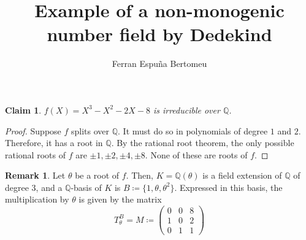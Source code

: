 \documentclass[11pt]{article}
\title{Example of a non-monogenic number field by Dedekind}
\author{Ferran Espuña Bertomeu}
\newtheorem{claim}[theorem]{Claim}
\theoremstyle{definition}
\newtheorem{rk}[theorem]{Remark}
\begin{document}
    \maketitle

    \begin{claim}
        $f(X)=X^3-X^2-2X-8$ is irreducible over $\mathbb{Q}$.
    \end{claim}
    \begin{proof}
        Suppose $f$ splits over $\mathbb{Q}$.
        It must do so in polynomials of degree $1$ and $2$.
        Therefore, it has a root in $\mathbb{Q}$.
        By the rational root theorem, the only possible rational roots of  $f$ are $\pm 1, \pm 2, \pm 4, \pm 8$.
        None of these are roots of $f$.
    \end{proof}

    \begin{rk}
        Let $\theta$ be a root of $f$.
        Then, $K = \mathbb{Q}(\theta)$ is a field extension of $\mathbb{Q}$ of degree $3$,
        and a $\mathbb{Q}$-basis of $K$ is $B \coloneqq \{1, \theta, \theta^2\}$.
        Expressed in this basis,
        the multiplication by $\theta$ is given by the matrix
        \[T_{\theta}^{B} = M \coloneqq
            \begin{pmatrix}
                0 & 0 & 8 \\
                1 & 0 & 2 \\
                0 & 1 & 1
            \end{pmatrix}
        \]
    \end{rk}
\end{document}
